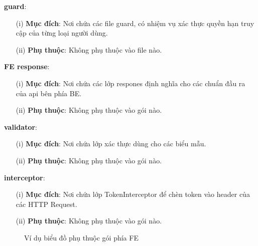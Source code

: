 \documentclass[../DoAn.tex]{subfiles}
\begin{document}
\textbf{guard}:
\begin{enumerate}
    \item[(i)] \textbf{Mục đích}: Nơi chứa các file guard, có nhiệm vụ xác thực quyền hạn truy cập của từng loại người dùng.
    \item[(ii)] \textbf{Phụ thuộc}: Không phụ thuộc vào file nào.
\end{enumerate}

\textbf{FE response}:
\begin{enumerate}
    \item[(i)] \textbf{Mục đích}: Nơi chứa các lớp respones định nghĩa cho các chuẩn đầu ra của api bên phía BE.
    \item[(ii)] \textbf{Phụ thuộc}: Không phụ thuộc vào gói nào.
\end{enumerate}

\textbf{validator}:
\begin{enumerate}
    \item[(i)] \textbf{Mục đích}: Nơi chứa lớp xác thực dùng cho các biểu mẫu.
    \item[(ii)] \textbf{Phụ thuộc}: Không phụ thuộc vào gói nào.
\end{enumerate}

\textbf{interceptor}:
\begin{enumerate}
    \item[(i)] \textbf{Mục đích}: Nơi chứa lớp TokenInterceptor để chèn token vào header của các HTTP Request.
    \item[(ii)] \textbf{Phụ thuộc}: Không phụ thuộc vào gói nào.
\end{enumerate}
\begin{figure}[H]
    \centering
    \caption{Ví dụ biểu đồ phụ thuộc gói phía FE}
    \label{fig:Fig1a}
\end{figure}
\end{document}
